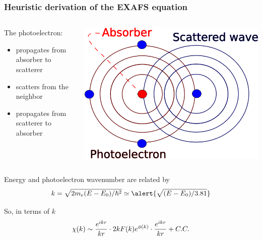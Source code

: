 \documentclass[10pt, xcolor=x11names, compress]{beamer}
\begin{document}
\begin{frame}
  \frametitle{Heuristic derivation of the EXAFS equation}
  \begin{columns}
    \begin{column}{0.5\linewidth}
      The photoelectron:
      \begin{itemize}
      \item propagates from absorber to scatterer
      \item scatters from the neighbor
      \item propagates from scatterer to absorber
      \end{itemize}
    \end{column}
    \begin{column}{0.5\linewidth}
        \includegraphics[width=\linewidth]{images/circles.png}      
    \end{column}
  \end{columns}
  
  \bigskip

  Energy and photoelectron wavenumber are related by
  \begin{equation}
    k = \sqrt{2m_e(E-E_0)/\hbar^2} \simeq \alert{\sqrt{(E-E_0)/3.81}}\notag
  \end{equation}

  So, in terms of $k$
  \begin{equation}
    \chi(k) \sim \frac{e^{ikr}}{kr} \cdot
    2kF(k)e^{\phi(k)} \cdot
    \frac{e^{ikr}}{kr} + C.C.
    \notag
  \end{equation}
\end{frame}
\end{document}
